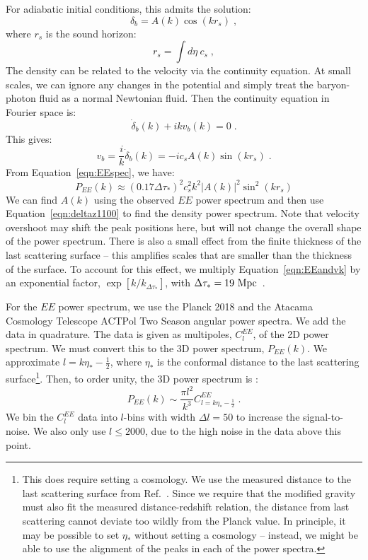 \documentclass[floats,floatfix,showpacs,amssymb,amsmath,prl,twocolumn,superscriptaddress,nofootinbib, aps]{revtex4-2}
\begin{document}
For adiabatic initial conditions, this admits the solution:
\begin{equation}\label{eqn:deltaz1100}
    \delta_b = A(k) \cos (kr_s) \; ,
\end{equation}
where $r_s$ is the sound horizon:
\begin{equation}
     r_s = \int d\eta~c_s \; ,
\end{equation}
The density can be related to the velocity via the continuity equation. At small scales, we can ignore any changes in the potential and simply treat the baryon-photon fluid as a normal Newtonian fluid. Then the continuity equation in Fourier space is:
\begin{equation}\label{eqn:continuity}
    \dot{\delta}_b(k) + ikv_b(k) = 0 \; .
\end{equation}
 This gives:
 \begin{equation}
      v_b = \frac{i}{k} \dot{\delta}_b(k) = - i  c_s A(k) \sin(k r_s) \; .
 \end{equation}
From Equation~\ref{eqn:EEspec}, we have:
\begin{equation}\label{eqn:EEandvk}
    P_{EE}(k) \approx (0.17 \Delta \tau_*)^2 c_s^2 k^2 |A(k)|^2 \sin^2(kr_s)
\end{equation}
We can find $A(k)$ using the observed $EE$ power spectrum and then use Equation~\ref{eqn:deltaz1100} to find the density power spectrum. Note that velocity overshoot may shift the peak positions here, but will not change the overall shape of the power spectrum. There is also a small effect from the finite thickness of the last scattering surface -- this amplifies scales that are smaller than the thickness of the surface. To account for this effect, we multiply Equation~\ref{eqn:EEandvk} by an exponential factor, $\exp[k/k_{\Delta \tau_*}]$, with $\Delta \tau_* = 19~\rm{Mpc}$~\citep{Hadzhiyska2019}.

For the $EE$ power spectrum, we use the Planck 2018 \citep{Planck2019} and the Atacama Cosmology Telescope ACTPol Two Season \citep{ACT2016} angular power spectra. We add the data in quadrature. The data is given as multipoles, $C_l^{EE}$, of the 2D power spectrum. We must convert this to the 3D power spectrum, $P_{EE}(k)$. We approximate $l = k\eta_* - \frac{1}{2}$, where $\eta_*$ is the conformal distance to the last scattering surface\footnote{This does require setting a cosmology. We use the measured distance to the last scattering surface from Ref.~\citep{Planck2018}. Since we require that the modified gravity must also fit the measured distance-redshift relation, the distance from last scattering cannot deviate too wildly from the Planck value. In principle, it may be possible to set $\eta_*$ without setting a cosmology -- instead, we might be able to use the alignment of the peaks in each of the power spectra.}\citep{Loverde2008}. Then, to order unity, the 3D power spectrum is \citep{Bond1987, Loverde2008}:
\begin{equation}
    P_{EE}(k) \sim \frac{\pi l^2}{k^3}C_{l=k\eta_{*}-\frac{1}{2}}^{EE} \; .
\end{equation}
We bin the $C_{l}^{EE}$ data into $l$-bins with width $\Delta l = 50$ to increase the signal-to-noise. We also only use $l\leq2000$, due to the high noise in the data above this point.
\end{document}
